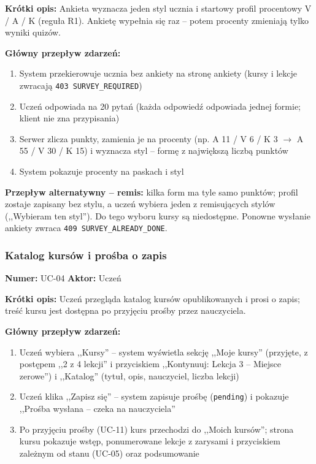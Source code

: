 \textbf{Krótki opis:} Ankieta wyznacza jeden styl ucznia i startowy profil procentowy V / A / K (reguła R1). Ankietę wypełnia się raz -- potem procenty zmieniają tylko wyniki quizów.

\textbf{Główny przepływ zdarzeń:}
\begin{enumerate}[leftmargin=*]
    \item System przekierowuje ucznia bez ankiety na stronę ankiety (kursy i lekcje zwracają \texttt{403 SURVEY\_REQUIRED})
    \item Uczeń odpowiada na 20 pytań (każda odpowiedź odpowiada jednej formie; klient nie zna przypisania)
    \item Serwer zlicza punkty, zamienia je na procenty (np. A 11 / V 6 / K 3 $\to$ A 55 / V 30 / K 15) i wyznacza styl -- formę z największą liczbą punktów
    \item System pokazuje procenty na paskach i styl
\end{enumerate}

\textbf{Przepływ alternatywny -- remis:} kilka form ma tyle samo punktów; profil zostaje zapisany bez stylu, a uczeń wybiera jeden z remisujących stylów (,,Wybieram ten styl''). Do tego wyboru kursy są niedostępne. Ponowne wysłanie ankiety zwraca \texttt{409 SURVEY\_ALREADY\_DONE}.

\subsubsection{Katalog kursów i prośba o zapis}
\textbf{Numer:} UC-04 \quad \textbf{Aktor:} Uczeń

\textbf{Krótki opis:} Uczeń przegląda katalog kursów opublikowanych i prosi o zapis; treść kursu jest dostępna po przyjęciu prośby przez nauczyciela.

\textbf{Główny przepływ zdarzeń:}
\begin{enumerate}[leftmargin=*]
    \item Uczeń wybiera ,,Kursy'' -- system wyświetla sekcję ,,Moje kursy'' (przyjęte, z postępem ,,2 z 4 lekcji'' i przyciskiem ,,Kontynuuj: Lekcja 3 -- Miejsce zerowe'') i ,,Katalog'' (tytuł, opis, nauczyciel, liczba lekcji)
    \item Uczeń klika ,,Zapisz się'' -- system zapisuje prośbę (\texttt{pending}) i pokazuje ,,Prośba wysłana -- czeka na nauczyciela''
    \item Po przyjęciu prośby (UC-11) kurs przechodzi do ,,Moich kursów''; strona kursu pokazuje wstęp, ponumerowane lekcje z zarysami i przyciskiem zależnym od stanu (UC-05) oraz podsumowanie
\end{enumerate}

